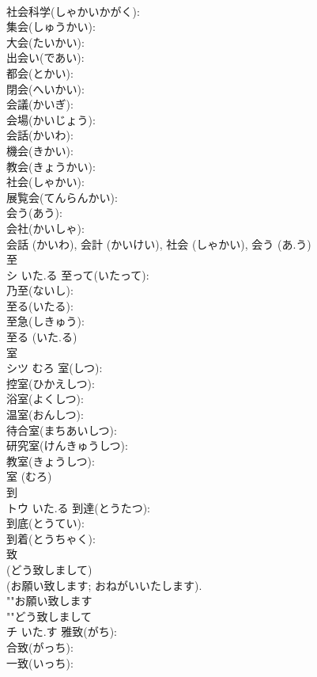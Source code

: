 \documentclass[8pt]{extreport}
\begin{document}
\begin{CJK}{UTF8}{min}
\\	社会科学(しゃかいかがく): 
\\	集会(しゅうかい): 
\\	大会(たいかい): 
\\	出会い(であい): 
\\	都会(とかい): 
\\	閉会(へいかい): 
\\	会議(かいぎ): 
\\	会場(かいじょう): 
\\	会話(かいわ): 
\\	機会(きかい): 
\\	教会(きょうかい): 
\\	社会(しゃかい): 
\\	展覧会(てんらんかい): 
\\	会う(あう): 
\\	会社(かいしゃ): 
\\	会話 (かいわ), 会計 (かいけい), 社会 (しゃかい), 会う (あ.う)
\\	至			
\\	シ	いた.る	至って(いたって): 
\\	乃至(ないし): 
\\	至る(いたる): 
\\	至急(しきゅう): 
\\	至る (いた.る)
\\	室			
\\	シツ	むろ	室(しつ): 
\\	控室(ひかえしつ): 
\\	浴室(よくしつ): 
\\	温室(おんしつ): 
\\	待合室(まちあいしつ): 
\\	研究室(けんきゅうしつ): 
\\	教室(きょうしつ): 
\\	室 (むろ)
\\	到			
\\	トウ	いた.る	到達(とうたつ): 
\\	到底(とうてい): 
\\	到着(とうちゃく): 
\\	致			
\\	(どう致しまして) 
\\	(お願い致します; おねがいいたします). 
\\	""お願い致します
\\	""どう致しまして
\\	チ	いた.す	雅致(がち): 
\\	合致(がっち): 
\\	一致(いっち): 

\end{CJK}
\end{document}
